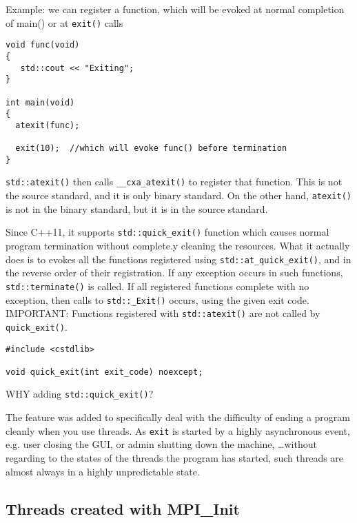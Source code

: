 Example: we can register a function, which will be evoked at normal completion of main() or at \verb!exit()! calls
\begin{lstlisting}
void func(void)
{
   std::cout << "Exiting";
}

int main(void)
{
  atexit(func);
  
  exit(10);  //which will evoke func() before termination
}
\end{lstlisting}

\verb!std::atexit()! then calls \verb!__cxa_atexit()! to register that function.
This is not the source standard, and it is only binary standard.
On the other hand, \verb!atexit()! is not in the binary standard, but it is in
the source standard.


Since C++11, it supports \verb!std::quick_exit()! function which causes normal
program termination without complete.y cleaning the resources. What it actually
does is to evokes all the functions registered using
\verb!std::at_quick_exit()!, and in the reverse order of their registration.
If any exception occurs in such functions, \verb!std::terminate()! is called. If
all registered functions complete with no exception, then calls to
\verb!std::_Exit()! occurs, using the given exit code.
IMPORTANT: Functions registered with \verb!std::atexit()! are not called by
\verb!quick_exit()!.


\begin{lstlisting}
#include <cstdlib>

void quick_exit(int exit_code) noexcept;
\end{lstlisting}

\begin{mdframed}

WHY adding \verb!std::quick_exit()!?

The feature was added to specifically deal with the difficulty of ending a
program cleanly when you use threads.
As \verb!exit! is started by a highly asynchronous event, e.g. user closing the
GUI, or admin shutting down the machine, \ldots without regarding to the states
of the threads the program has started, such threads are almost always in a
highly unpredictable state.




\end{mdframed}

\subsection{Threads created with MPI\_Init}


